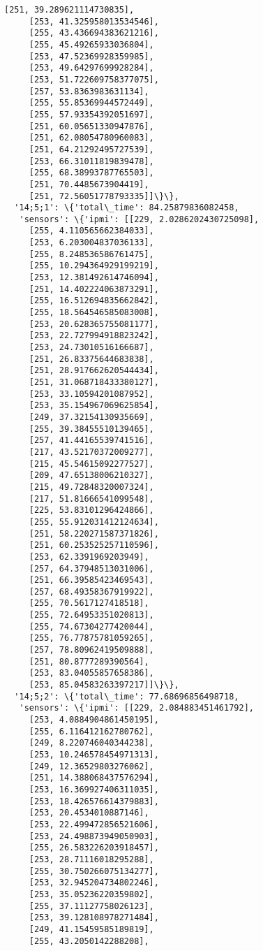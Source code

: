 \documentclass[11pt]{article}
\begin{document}
\begin{tcolorbox}[breakable, size=fbox, boxrule=.5pt, pad at break*=1mm, opacityfill=0]
\begin{Verbatim}[commandchars=\\\{\}]
     [251, 39.289621114730835],
     [253, 41.325958013534546],
     [255, 43.436694383621216],
     [255, 45.49265933036804],
     [253, 47.52369928359985],
     [253, 49.64297699928284],
     [253, 51.722609758377075],
     [257, 53.8363983631134],
     [255, 55.85369944572449],
     [255, 57.93354392051697],
     [251, 60.05651330947876],
     [251, 62.08054780960083],
     [251, 64.21292495727539],
     [253, 66.31011819839478],
     [255, 68.38993787765503],
     [251, 70.4485673904419],
     [251, 72.56051778793335]]\}\},
  '14;5;1': \{'total\_time': 84.25879836082458,
   'sensors': \{'ipmi': [[229, 2.0286202430725098],
     [255, 4.110565662384033],
     [253, 6.203004837036133],
     [255, 8.248536586761475],
     [255, 10.294364929199219],
     [253, 12.381492614746094],
     [251, 14.402224063873291],
     [255, 16.512694835662842],
     [255, 18.564546585083008],
     [253, 20.628365755081177],
     [253, 22.727994918823242],
     [253, 24.73010516166687],
     [251, 26.83375644683838],
     [251, 28.917662620544434],
     [251, 31.068718433380127],
     [253, 33.10594201087952],
     [253, 35.154967069625854],
     [249, 37.32154130935669],
     [255, 39.38455510139465],
     [257, 41.44165539741516],
     [217, 43.52170372009277],
     [215, 45.54615092277527],
     [209, 47.65138006210327],
     [215, 49.72848320007324],
     [217, 51.81666541099548],
     [225, 53.83101296424866],
     [255, 55.912031412124634],
     [251, 58.220271587371826],
     [251, 60.253525257110596],
     [253, 62.3391969203949],
     [257, 64.37948513031006],
     [251, 66.39585423469543],
     [257, 68.49358367919922],
     [255, 70.5617127418518],
     [255, 72.64953351020813],
     [255, 74.67304277420044],
     [255, 76.77875781059265],
     [257, 78.80962419509888],
     [251, 80.8777289390564],
     [253, 83.04055857658386],
     [253, 85.04583263397217]]\}\},
  '14;5;2': \{'total\_time': 77.68696856498718,
   'sensors': \{'ipmi': [[229, 2.084883451461792],
     [253, 4.0884904861450195],
     [255, 6.116412162780762],
     [249, 8.220746040344238],
     [253, 10.246578454971313],
     [249, 12.36529803276062],
     [251, 14.388068437576294],
     [253, 16.369927406311035],
     [253, 18.426576614379883],
     [253, 20.4534010887146],
     [253, 22.499472856521606],
     [253, 24.498873949050903],
     [255, 26.583226203918457],
     [253, 28.71116018295288],
     [255, 30.750266075134277],
     [253, 32.945204734802246],
     [253, 35.05236220359802],
     [255, 37.11127758026123],
     [253, 39.128108978271484],
     [249, 41.15459585189819],
     [255, 43.2050142288208],

\end{Verbatim}
\end{tcolorbox}
\end{document}
